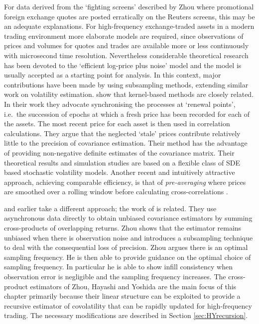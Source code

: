 For data derived from the `fighting screens' described by Zhou where promotional foreign exchange quotes are posted erratically on the Reuters screens, this may be an adequate explanations. For high-frequency exchange-traded assets in a modern trading environment more elaborate models are required, since observations of prices and volumes for quotes and trades are available more or less continuously with microsecond time resolution.  Nevertheless considerable theoretical research has been devoted to the  `efficient log-price plus noise' model and the model is usually accepted as a starting point for analysis. In this context, major contributions have been made by \citet{zhang2011estimating} using subsampling methods, extending similar work on volatility estimation. \citet{barndorff2011multivariate} show that kernel-based methods are closely related. In their work they advocate synchronising the processes at `renewal points', i.e.\ the succession of epochs at which a fresh price has been recorded for each of the assets. The most recent price for each asset is then used in correlation calculations.  They argue that the neglected `stale' prices contribute relatively little to the precision of covariance estimation. Their method has the advantage of providing non-negative definite estimates of the covariance matrix.  Their theoretical results and simulation studies are based on a flexible class of SDE based stochastic volatility models. Another recent and intuitively attractive approach, achieving comparable efficiency, is that of \emph{pre-averaging} where prices are smoothed over a rolling window before calculating cross-correlations \citep{jacod2009microstructure,podolskij2009estimation}.  

\citet{hayashi2005covariance} and earlier \citet{zhou1998estimating} take a different approach; the work of \citet{de1997high} is related. They use asynchronous data directly to obtain unbiased covariance estimators by summing cross-products of overlapping returns. Zhou shows that the estimator remains unbiased when there is observation noise and introduces a subsampling technique to deal with the consequential loss of precision. Zhou argues
there is an optimal sampling frequency. He is then able to provide guidance on the optimal choice of sampling frequency. In particular he is able to show infill consistency when observation error is negligible and the sampling frequency increases. The cross-product estimators of Zhou, Hayashi and Yoshida are the main focus of this chapter primarily because their linear structure can be exploited to provide a recursive estimator of covolatility that can be rapidly updated for high-frequency trading. The necessary modifications are described in Section \ref{sec:HYrecursion}.    

